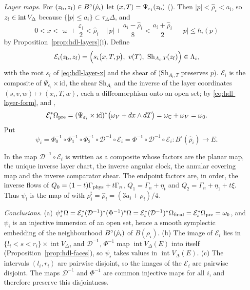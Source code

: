 \emph{Layer maps.} For $(z_{\rm b},z_{\rm f})\in B^\circ(\hat\rho_i)$ let $(x,T)=\Psi_{\varepsilon_i}(z_{\rm b})$
(). Then $|p|<\hat\rho_i<a_i$, so $z_{\rm f}\in\operatorname{int}V_\Delta$ because
$\{|p|\le a_i\}\subset\tau_\Delta\Delta$, and
\[
 0<x<\varpi+\frac{\varepsilon_i}2
 <\hat\rho_i-|p|+\frac{a_i-\hat\rho_i}{8}
 <\frac{a_i+\hat\rho_i}{2}-|p|\le h_i(p)
\]
by Proposition~\ref{prop:hdl-layers}(i). Define
\[
 \mathcal E_i(z_{\rm b},z_{\rm f})=\Big(s_i\big(x,T,p\big),\ v(T),\ \mathrm{Sh}_{A_i,T}(z_{\rm f})\Big)\in\Lambda_i ,
\]
with the root $s_i$ of \eqref{eq:hdl-layer-x} and the shear of  ($\mathrm{Sh}_{A_i,T}$ preserves $p$).
$\mathcal E_i$ is the composite of $\Psi_{\varepsilon_i}\times\mathrm{id}$, the shear $\mathrm{Sh}_{A_i}$ and the inverse of the layer
coordinates $(s,v,w)\mapsto(x_i,T,w)$, each a diffeomorphism onto an open set; by \eqref{eq:hdl-layer-form},
 and ,
\[
 \mathcal E_i^*\Omega_{\rm pre}=(\Psi_{\varepsilon_i}\times\mathrm{id})^*\big(\omega_V+dx\wedge dT\big)=\omega_{\mathbb{C}}+\omega_V=\omega_0 .
\]
Put
\[
 \psi_i=\Phi_0^{-1}\circ\Phi_1^{-1}\circ\Phi_2^{-1}
             \circ\mathcal D^{-1}\circ\mathcal E_i
       =\Phi^{-1}\circ\mathcal D^{-1}\circ\mathcal E_i
       \colon B^\circ(\hat\rho_i)\to E .
\]

In  the map $\mathcal D^{-1}\circ\mathcal E_i$ is written as a composite whose factors are the planar map, the unique inverse layer chart, the inverse angular clock,
the annular covering map and the inverse comparator shear. The endpoint factors are, in order,
the inverse flows of $Q_0=(1-t)\Gamma_{\rm phys}+t\Gamma_n$,
$Q_1=\Gamma_n+\eta_t$ and $Q_2=\Gamma_n+\eta_1+t\xi$.
Thus $\psi_i$ is the map of  with $\rho_i^\sharp=\hat\rho_i=(3a_i+\rho_i)/4$.

\emph{Conclusions.} (a) $\psi_i^*\Omega=\mathcal E_i^*(\mathcal D^{-1})^*(\Phi^{-1})^*\Omega=\mathcal E_i^*(\mathcal D^{-1})^*\Omega_{\rm final}
=\mathcal E_i^*\Omega_{\rm pre}=\omega_0$, and $\psi_i$ is an injective immersion of an open set, hence a smooth symplectic embedding of
the neighbourhood $B^{\circ}(\hat\rho_i)$ of $B(\rho_i)$. (b) The image of $\mathcal E_i$ lies in
$\{l_i<s<r_i\}\times\operatorname{int}V_\Delta$, and $\mathcal D^{-1}$, $\Phi^{-1}$ map $\operatorname{int}V_\Delta(E)$ into itself
(Proposition~\ref{prop:hdl-faces}), so $\psi_i$ takes values in $\operatorname{int}V_\Delta(E)$. (c) The intervals
$(l_i,r_i)$ are pairwise disjoint, so the images of the $\mathcal E_i$ are pairwise disjoint.
The maps $\mathcal D^{-1}$ and $\Phi^{-1}$ are common injective maps for all $i$, and therefore preserve this disjointness.


